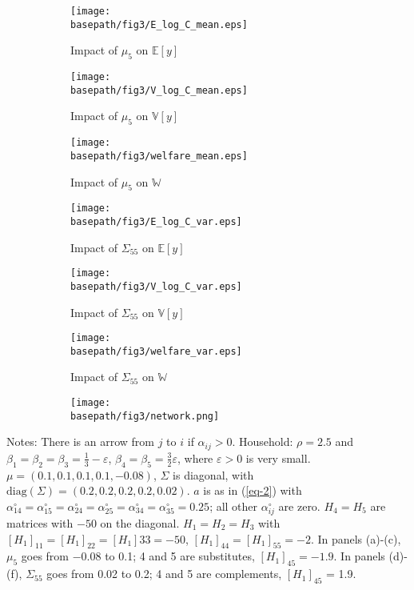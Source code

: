 \documentclass[11pt]{article}
\theoremstyle{definition}
\newcommand{\basepath}{F:/12004835/replication_package_final/replication_package_final/output_figures}
\begin{document}
	\begin{figure}[ht]
		\caption{The non-monotone impact of beliefs on GDP}
		\centering
		\begin{subfigure}[b]{0.32\textwidth} 
			\caption{Impact of $\mu_5$ on $\mathbb{E}[y]$}
			\texttt{[image: \\basepath/fig3/E\_log\_C\_mean.eps]}
			\label{fig:3-a}
		\end{subfigure}
		\hfill
		\begin{subfigure}[b]{0.32\textwidth}
			\caption{Impact of $\mu_5$ on $\mathbb{V}[y]$}
			\texttt{[image: \\basepath/fig3/V\_log\_C\_mean.eps]}
			\label{fig:3-b}
		\end{subfigure}
		\hfill
		\begin{subfigure}[b]{0.32\textwidth}
			\caption{Impact of $\mu_5$ on $\mathbb{W}$}
			\texttt{[image: \\basepath/fig3/welfare\_mean.eps]}
			\label{fig:3-c}
		\end{subfigure}
		
		\begin{subfigure}[b]{0.32\textwidth} 
			\caption{Impact of $\Sigma_{55}$ on $\mathbb{E}[y]$}
			\texttt{[image: \\basepath/fig3/E\_log\_C\_var.eps]}
			\label{fig:3-d}
		\end{subfigure}
		\hfill
		\begin{subfigure}[b]{0.32\textwidth}
			\caption{Impact of $\Sigma_{55}$ on $\mathbb{V}[y]$}
			\texttt{[image: \\basepath/fig3/V\_log\_C\_var.eps]}
			\label{fig:3-e}
		\end{subfigure}
		\hfill
		\begin{subfigure}[b]{0.32\textwidth}
			\caption{Impact of $\Sigma_{55}$ on $\mathbb{W}$}
			\texttt{[image: \\basepath/fig3/welfare\_var.eps]}
			\label{fig:3-f}
		\end{subfigure}
		
		\begin{subfigure}[b]{0.5\textwidth}
			\texttt{[image: \\basepath/fig3/network.png]}
			\label{fig:3-g}
		\end{subfigure}
		\label{fig:3}
	\end{figure}
	
	Notes: There is an arrow from $j$ to $i$ if $\alpha_{ij} > 0$. Household: $\rho = 2.5$ and $\beta_1 = \beta_2 = \beta_3 = \frac{1}{3} − \varepsilon$, $\beta_4 = \beta_5 = \frac{3}{2}\varepsilon$, where
	$\varepsilon > 0$ is very small. $\mu = (0.1, 0.1, 0.1, 0.1, −0.08)$, $\Sigma$ is diagonal, with $\text{diag}(\Sigma) = (0.2, 0.2, 0.2, 0.2, 0.02)$. $a$ is as in (\ref{eq-2}) with $\alpha^{\circ}_{14} = \alpha^{\circ}_{15} = \alpha^{\circ}_{24} = \alpha^{\circ}_{25} = \alpha^{\circ}_{34} = \alpha^{\circ}_{35} = 0.25$; all other $\alpha^{\circ}_{ij}$ are zero. $H_4 = H_5$ are matrices with $−50$ on the diagonal. $H_1 = H_2 = H_3$ with $[H_1]_{11} = [H_1]_{22} = [H_1]{33} = −50$, $[H_1]_{44} = [H_1]_{55} = −2$. In panels (a)-(c), $\mu_5$ goes from −0.08 to 0.1; 4 and 5 are substitutes, $[H_1]_{45} = −1.9$. In panels (d)-(f), $\Sigma_{55}$ goes from 0.02 to 0.2; 4 and 5 are complements, $[H_1]_{45}$ = 1.9.
	
\end{document}
